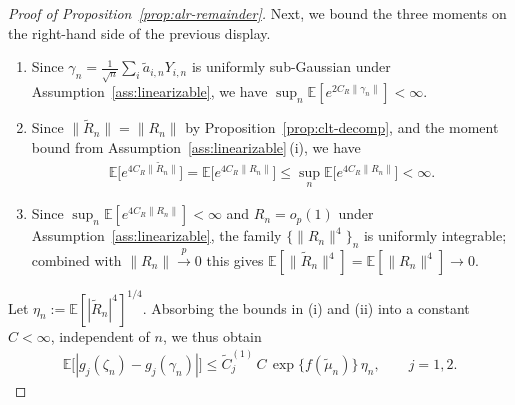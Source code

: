 \documentclass[12pt]{article}
\newcommand{\Ee}{{\mathbb{E}}}
\begin{document}
\begin{appendices}
\begin{proof}[Proof of Proposition~\ref{prop:alr-remainder}]
Next, we bound the three moments on the right-hand side of the previous display.
\begin{enumerate}
    \item Since $\gamma_n=\frac{1}{\sqrt n}\sum_i\widetilde a_{i,n}Y_{i,n}$ is uniformly sub-Gaussian under Assumption~\ref{ass:linearizable}, we have
$\sup_n\Ee[e^{2C_R\|\gamma_n\|}]<\infty$.
    \item Since
$\|\widetilde R_n\|=\|R_n\|$ by Proposition~\ref{prop:clt-decomp}, and the moment bound from Assumption~\ref{ass:linearizable}\,(i), we have 
\begin{align*}
  \Ee\big[e^{4C_R\|\widetilde R_n\|}\big]
  =\Ee\big[e^{4C_R\|R_n\|}\big]
  \le\sup_n\Ee\big[e^{4C_R\|R_n\|}\big]<\infty.
\end{align*}
   \item Since
$\sup_n\Ee[e^{4C_R\|R_n\|}]<\infty$ and $R_n=o_p(1)$ under
Assumption~\ref{ass:linearizable}, the family $\{\|R_n\|^4\}_n$ is
uniformly integrable; combined with $\|R_n\|\xrightarrow{p}0$ this gives
$\Ee[\|\widetilde R_n\|^4]=\Ee[\|R_n\|^4]\to0$.
\end{enumerate}

Let $\eta_n:=\Ee[|\widetilde R_n|^4]^{1/4}$. 
Absorbing the bounds in (i) and (ii) into a constant $C<\infty$, independent of $n$, we thus obtain
\begin{align}
  \label{eq:mvt-final}
  \Ee\big[|g_j(\zeta_n)-g_j(\gamma_n)|\big]
  \le\widetilde C_j^{(1)}\,C\,\exp\{f(\widetilde\mu_n)\}\,\eta_n,
  \qquad j=1,2.
\end{align}


\end{proof}
\end{appendices}
\end{document}
